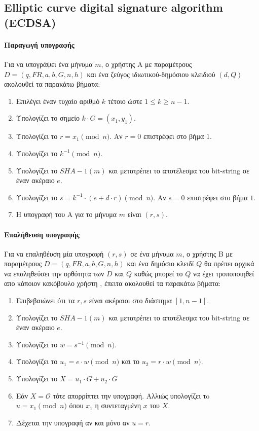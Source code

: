 \documentclass[12pt]{article}
\begin{document}
\subsection{Elliptic curve digital signature algorithm (ECDSA)}
\paragraph{Παραγωγή υπογραφής}
Για να υπογράψει ένα μήνυμα $m$, ο χρήστης Α με παραμέτρους $D = (q, FR, a, b, G, n, h)$ και ένα ζεύγος ιδιωτικού-δημόσιου κλειδιού $(d, Q)$ ακολουθεί τα παρακάτω βήματα:
\begin{enumerate}
\item Επιλέγει έναν τυχαίο αριθμό $k$ τέτοιο ώστε $1 \leq k \geq n-1$.
\item Υπολογίζει το σημείο $k \cdot G = (x_1, y_1)$.
\item Υπολογίζει το $r = x_1 \pmod n$. Αν $r = 0$ επιστρέφει στο βήμα $1$.
\item Υπολογίζει το $k^{-1} \pmod n$.
\item Υπολογίζει το $SHA-1(m)$ και μετατρέπει το αποτέλεσμα του bit-string σε έναν ακέραιο $e$.
\item Υπολογίζει το $s = k^{-1} \cdot (e + d \cdot r) \pmod n$. Αν $s = 0$ επιστρέφει στο βήμα $1$.
\item Η υπογραφή του A για το μήνυμα $m$ είναι $(r,s)$.
\end{enumerate}

\paragraph{Επαλήθευση υπογραφής}
Για να επαληθέυση μία υπογραφή $(r,s)$ σε ένα μήνυμα $m$, ο χρήστης Β με παραμέτρους $D = (q, FR, a, b, G, n, h)$ και ένα δημόσιο κλειδί $Q$ θα πρέπει αρχικά να επαληθεύσει την ορθότητα των $D$ και $Q$ καθώς μπορεί το $Q$ να έχει τροποποιηθεί απο κάποιον κακόβουλο χρήστη \cite{ECDSA}, έπειτα ακολουθεί τα παρακάτω βήματα:
\begin{enumerate}
\item Επιβεβαιώνει ότι τα $r,s$ είναι ακέραιοι στο διάστημα $[1, n-1]$.
\item Υπολογίζει το $SHA-1(m)$ και μετατρέπει το αποτέλεσμα του bit-string σε έναν ακέραιο $e$.
\item Υπολογίζει το $w = s^{-1} \pmod n$.
\item Υπολογίζει το $u_1 = e \cdot w \pmod n$ και το $u_2 = r \cdot w \pmod n$.
\item Υπολογίζει το $X = u_1 \cdot G + u_2 \cdot G$
\item Εάν $X = \mathcal{O}$ τότε απορρίπτει την υπογραφή. Αλλιώς υπολογίζει τo $u = x_1 \pmod n$ όπου $x_1$ η συντεταγμένη $x$ του $X$. 
\item Δέχεται την υπογραφή αν και μόνο αν $u = r$.
\end{enumerate}
\pagebreak
\end{document}
